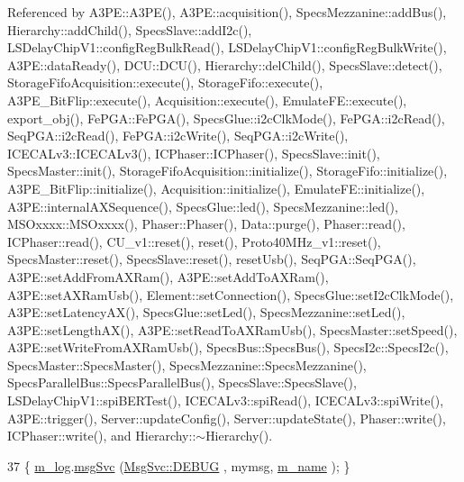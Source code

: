 Referenced by A3\+P\+E\+::\+A3\+P\+E(), A3\+P\+E\+::acquisition(), Specs\+Mezzanine\+::add\+Bus(), Hierarchy\+::add\+Child(), Specs\+Slave\+::add\+I2c(), L\+S\+Delay\+Chip\+V1\+::config\+Reg\+Bulk\+Read(), L\+S\+Delay\+Chip\+V1\+::config\+Reg\+Bulk\+Write(), A3\+P\+E\+::data\+Ready(), D\+C\+U\+::\+D\+C\+U(), Hierarchy\+::del\+Child(), Specs\+Slave\+::detect(), Storage\+Fifo\+Acquisition\+::execute(), Storage\+Fifo\+::execute(), A3\+P\+E\+\_\+\+Bit\+Flip\+::execute(), Acquisition\+::execute(), Emulate\+F\+E\+::execute(), export\+\_\+obj(), Fe\+P\+G\+A\+::\+Fe\+P\+G\+A(), Specs\+Glue\+::i2c\+Clk\+Mode(), Fe\+P\+G\+A\+::i2c\+Read(), Seq\+P\+G\+A\+::i2c\+Read(), Fe\+P\+G\+A\+::i2c\+Write(), Seq\+P\+G\+A\+::i2c\+Write(), I\+C\+E\+C\+A\+Lv3\+::\+I\+C\+E\+C\+A\+Lv3(), I\+C\+Phaser\+::\+I\+C\+Phaser(), Specs\+Slave\+::init(), Specs\+Master\+::init(), Storage\+Fifo\+Acquisition\+::initialize(), Storage\+Fifo\+::initialize(), A3\+P\+E\+\_\+\+Bit\+Flip\+::initialize(), Acquisition\+::initialize(), Emulate\+F\+E\+::initialize(), A3\+P\+E\+::internal\+A\+X\+Sequence(), Specs\+Glue\+::led(), Specs\+Mezzanine\+::led(), M\+S\+Oxxxx\+::\+M\+S\+Oxxxx(), Phaser\+::\+Phaser(), Data\+::purge(), Phaser\+::read(), I\+C\+Phaser\+::read(), C\+U\+\_\+v1\+::reset(), reset(), Proto40\+M\+Hz\+\_\+v1\+::reset(), Specs\+Master\+::reset(), Specs\+Slave\+::reset(), reset\+Usb(), Seq\+P\+G\+A\+::\+Seq\+P\+G\+A(), A3\+P\+E\+::set\+Add\+From\+A\+X\+Ram(), A3\+P\+E\+::set\+Add\+To\+A\+X\+Ram(), A3\+P\+E\+::set\+A\+X\+Ram\+Usb(), Element\+::set\+Connection(), Specs\+Glue\+::set\+I2c\+Clk\+Mode(), A3\+P\+E\+::set\+Latency\+A\+X(), Specs\+Glue\+::set\+Led(), Specs\+Mezzanine\+::set\+Led(), A3\+P\+E\+::set\+Length\+A\+X(), A3\+P\+E\+::set\+Read\+To\+A\+X\+Ram\+Usb(), Specs\+Master\+::set\+Speed(), A3\+P\+E\+::set\+Write\+From\+A\+X\+Ram\+Usb(), Specs\+Bus\+::\+Specs\+Bus(), Specs\+I2c\+::\+Specs\+I2c(), Specs\+Master\+::\+Specs\+Master(), Specs\+Mezzanine\+::\+Specs\+Mezzanine(), Specs\+Parallel\+Bus\+::\+Specs\+Parallel\+Bus(), Specs\+Slave\+::\+Specs\+Slave(), L\+S\+Delay\+Chip\+V1\+::spi\+B\+E\+R\+Test(), I\+C\+E\+C\+A\+Lv3\+::spi\+Read(), I\+C\+E\+C\+A\+Lv3\+::spi\+Write(), A3\+P\+E\+::trigger(), Server\+::update\+Config(), Server\+::update\+State(), Phaser\+::write(), I\+C\+Phaser\+::write(), and Hierarchy\+::$\sim$\+Hierarchy().


\begin{DoxyCode}
37 \{ \hyperlink{classObject_a0d269813dd7ac1f24bc143031e2963f2}{m\_log}.\hyperlink{classMsgSvc_ad25f18047920cc59a314e5098259711c}{msgSvc} (\hyperlink{classMsgSvc_ae671eb7301996cd049d2da8a65925926a1dbdcc82dce88370ec335883c83b38b0}{MsgSvc::DEBUG}   , mymsg, \hyperlink{classObject_a8b83c95c705d2c3ba0d081fe1710f48d}{m\_name} ); \}
\end{DoxyCode}
\mbox{\label{classObject_a6c9a0397ca804e04d675ed05683f5420}} 
